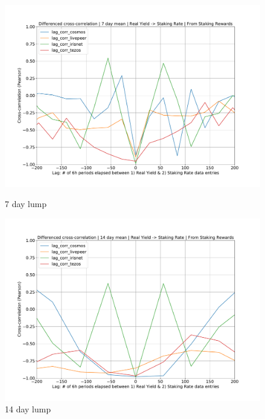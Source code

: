 \documentclass[longbibliography,nofootinbib]{revtex4-1}
\begin{document}
\begin{figure}
 \centering
    \begin{minipage}{0.5\textwidth}
        \centering
        \includegraphics[width=1\textwidth]{graphs/CrossCorr_SR_DIF_7.pdf}
        \caption{7 day lump}
    \end{minipage}\hfill
    \begin{minipage}{0.5\textwidth}
        \centering
        \includegraphics[width=1\textwidth]{graphs/CrossCorr_SR_DIF_14.pdf}
        \caption{14 day lump}
    \end{minipage}
    \begin{minipage}{0.5\textwidth}
        \centering

\end{minipage}
\end{figure}
\end{document}
